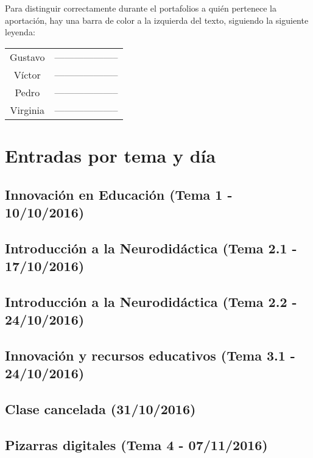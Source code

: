 Para distinguir correctamente durante el portafolios a quién pertenece la aportación, hay una barra de color a la izquierda del texto, siguiendo la siguiente leyenda:

\begin{table}[h!]
\centering
\begin{tabular}{|c|c|}
\hline
Gustavo & \colorbox{\guscolor}{--------------------}\\
Víctor & \colorbox{\victorcolor}{--------------------}\\
Pedro & \colorbox{\pedrocolor}{--------------------}\\
Virginia & \colorbox{\virgicolor}{--------------------}\\
\hline
\end{tabular}
\end{table}

\section{Entradas por tema y día}

\subsection{Innovación en Educación (Tema 1 - 10/10/2016)}


\subsection{Introducción a la Neurodidáctica (Tema 2.1 - 17/10/2016)}


\subsection{Introducción a la Neurodidáctica (Tema 2.2 - 24/10/2016)}


\subsection{Innovación y recursos educativos (Tema 3.1 - 24/10/2016)}


\subsection{Clase cancelada (31/10/2016)}

\subsection{Pizarras digitales (Tema 4 - 07/11/2016)}


